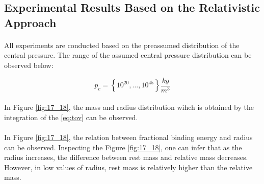 \documentclass[letterpaper,12pt]{article}
\begin{document}
\subsection{Experimental Results Based on the Relativistic Approach}

\paragraph{} All experiments are conducted based on the preassumed distribution of the central pressure. The range of the assumed central pressure distribution can be observed below:

\begin{equation*}
    p_c = \left\{10^{20}, \dots, 10^{45}\right\} \frac{kg}{m^3} 
\end{equation*}

\paragraph{} In Figure \ref{fig:17_18}, the mass and radius distribution wihch is obtained by the integration of the \eqref{eq:tov} can be observed.
\paragraph{} In Figure \ref{fig:17_18}, the relation between fractional binding energy and radius can be observed. Inspecting the Figure \ref{fig:17_18}, one can infer that as the radius increases, the difference between rest mass and  relative mass decreases. However, in low values of radius, rest mass is relatively higher than the relative mass.
\end{document}

